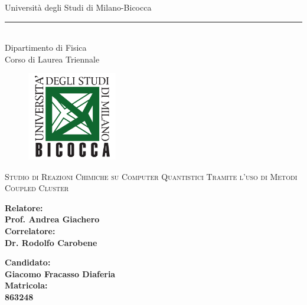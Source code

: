
\begin{titlepage}
    \begin{center}
        {\LARGE{Università degli Studi di Milano-Bicocca}}\\
        \rule{10cm}{0.2pt}\\
        \vspace{0.25cm}
        {{Dipartimento di Fisica}}\\
        \vspace{0.25cm}
        {{Corso di Laurea Triennale}}
    \end{center}
    
    \vspace{0.25cm}
    \begin{figure}[H]
        \centering
        \includegraphics[width=0.35\textwidth]{Immagini/Logo_Bicocca/Logo_bicocca.png}
    \end{figure}
    \vspace{1cm}
    
    \begin{center}
        {\Large{\textsc{Studio di Reazioni Chimiche su Computer Quantistici Tramite l'uso di Metodi Coupled Cluster}}}
    \end{center}
    
    \vspace{2cm}
    
    \begin{minipage}[t]{0.47\textwidth}\raggedright%
        {\large{\bf{Relatore:\\Prof. Andrea Giachero\\}}}%
        \vspace{0.5cm}%
        {\large{\bf{Correlatore:\\Dr. Rodolfo Carobene}}}%
    \end{minipage}\hfill%
    \begin{minipage}[t]{0.47\textwidth}\raggedleft%
        {\large{\bf Candidato:\\ Giacomo Fracasso Diaferia\\}}%
        \vspace{0.5cm}%
        {\large{\bf Matricola:\\ 863248}}%
    \end{minipage}
    
    \vspace{6cm}
    
\end{titlepage}
